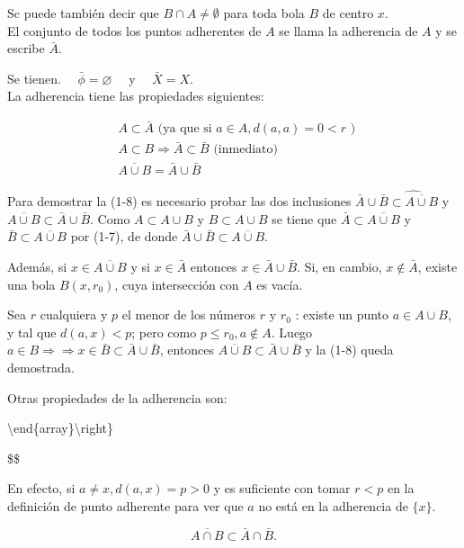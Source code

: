 \documentclass[10pt]{article}
\theoremstyle{plain}
\theoremstyle{definition}
\theoremstyle{remark}
\begin{document}
Sc puede también decir que $B \cap A \neq \emptyset$ para toda bola $B$ de centro $x$.\\
El conjunto de todos los puntos adherentes de $A$ se llama la adherencia de $A$ y se escribe $\bar{A}$.

Se tienen. $\quad \bar{\phi}=\varnothing \quad$ y $\quad \bar{X}=X$.\\
La adherencia tiene las propiedades siguientes:


\begin{align*}
& A \subset \bar{A} \text { (ya que si } a \in A, d(a, a)=0<r \text { ) }  \tag{1-6}\\
& A \subset B \Rightarrow \bar{A} \subset \bar{B} \text { (inmediato) }  \tag{1.7}\\
& \overline{A \cup B}=\bar{A} \cup \bar{B} \tag{1-8}
\end{align*}


Para demostrar la (1-8) es necesario probar las dos inclusiones $\bar{A} \cup \bar{B} \widehat{\subset \overline{A \cup B}}$ y $\overline{A \cup B} \subset \bar{A} \cup \bar{B}$. Como $A \subset A \cup B$ y $B \subset A \cup B$ se tiene que $\bar{A} \subset \overline{A \cup B}$ y $\bar{B} \subset \overline{A \cup B}$ por (1-7), de donde $\bar{A} \cup \bar{B} \subset \overline{A \cup B}$.

Además, si $x \in \overline{A \cup B}$ y si $x \in \bar{A}$ entonces $x \in \bar{A} \cup \bar{B}$. Si, en cambio, $x \notin \bar{A}$, existe una bola $B\left(x, r_{0}\right)$, cuya intersección con $A$ es vacía.

Sea $r$ cualquiera y $p$ el menor de los números $r$ y $r_{0}$ : existe un punto $a \in A \cup B$, y tal que $d(a, x)<p$; pero como $p \leqslant r_{0}, a \notin A$. Luego $a \in B \Rightarrow \Rightarrow x \in \bar{B} \subset \bar{A} \cup \bar{B}$, entonces $\overline{A \cup B} \subset \bar{A} \cup \bar{B}$ y la (1-8) queda demostrada.

Otras propiedades de la adherencia son:

\textbackslash end\{array\}\textbackslash right\}

\$\$

En efecto, si $a \neq x, d(a, x)=p>0$ y es suficiente con tomar $r<p$ en la definición de punto adherente para ver que $a$ no está en la adherencia de $\{x\}$.


\begin{equation*}
\overline{A \cap B} \subset \bar{A} \cap \bar{B} . \tag{1-10}
\end{equation*}
\end{document}
